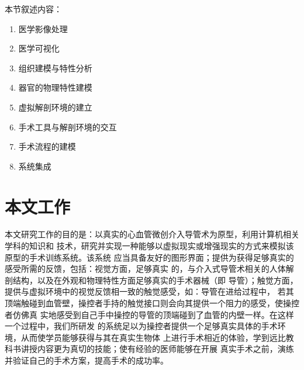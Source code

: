 本节叙述内容：
\begin{enumerate}
  \item 医学影像处理
  \item 医学可视化
  \item 组织建模与特性分析
  \item 器官的物理特性建模
  \item 虚拟解剖环境的建立
  \item 手术工具与解剖环境的交互
  \item 手术流程的建模
  \item 系统集成
\end{enumerate}

\section{本文工作}


本文研究工作的目的是：以真实的心血管微创介入导管术为原型，利用计算机相关学科的知识和
技术，研究并实现一种能够以虚拟现实或增强现实的方式来模拟该原型的手术训练系统。该系统
应当具备友好的图形界面；提供为获得足够真实的感受所需的反馈，包括：视觉方面，足够真实
的，与介入式导管术相关的人体解剖结构，以及在外观和物理特性方面足够真实的手术器械（即
导管）；触觉方面，提供与虚拟环境中的视觉反馈相一致的触觉感受，如：导管在进给过程中，
若其顶端触碰到血管壁，操控者手持的触觉接口则会向其提供一个阻力的感受，使操控者仿佛真
实地感受到自己手中操控的导管的顶端碰到了血管的内壁一样。在这样一个过程中，我们所研发
的系统足以为操控者提供一个足够真实具体的手术环境，从而使学员能够获得与其在真实生物体
上进行手术相近的体验，学到远比教科书讲授内容更为真切的技能；使有经验的医师能够在开展
真实手术之前，演练并验证自己的手术方案，提高手术的成功率。

